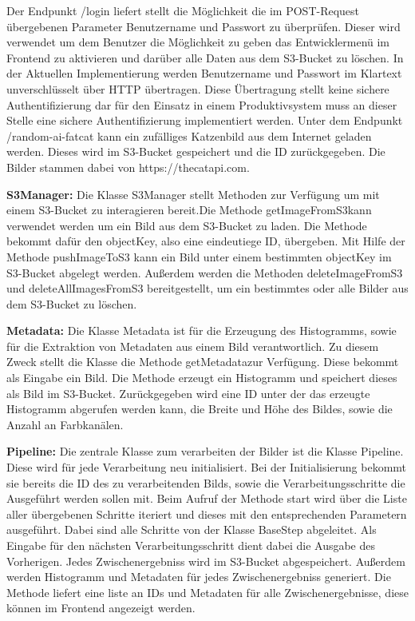 Der Endpunkt \glqq /login\grqq{} liefert stellt die Möglichkeit die im POST-Request übergebenen Parameter Benutzername und Passwort zu überprüfen. Dieser wird verwendet um dem Benutzer die Möglichkeit zu geben das Entwicklermenü im Frontend zu aktivieren und darüber alle Daten aus dem S3-Bucket zu löschen. In der Aktuellen Implementierung werden Benutzername und Passwort im Klartext unverschlüsselt über HTTP übertragen. Diese Übertragung stellt keine sichere Authentifizierung dar für den Einsatz in einem Produktivsystem muss an dieser Stelle eine sichere Authentifizierung implementiert werden.
Unter dem Endpunkt \glqq /random-ai-fatcat\grqq{} kann ein zufälliges Katzenbild aus dem Internet geladen werden. Dieses wird im S3-Bucket gespeichert und die ID zurückgegeben. Die Bilder stammen dabei von \glqq https://thecatapi.com\grqq{}. 

\textbf{S3Manager:} Die Klasse \glqq S3Manager\grqq{} stellt Methoden zur Verfügung um mit einem S3-Bucket zu interagieren bereit.Die Methode \glqq getImageFromS3\grqq kann verwendet werden um ein Bild aus dem S3-Bucket zu laden. Die Methode bekommt dafür den \glqq objectKey\grqq{}, also eine eindeutiege ID, übergeben. Mit Hilfe der Methode \glqq pushImageToS3\grqq{} kann ein Bild unter einem bestimmten \glqq objectKey\grqq{} im S3-Bucket abgelegt werden. Außerdem werden die Methoden \glqq deleteImageFromS3\grqq{} und \glqq deleteAllImagesFromS3\grqq{} bereitgestellt, um ein bestimmtes oder alle Bilder aus dem S3-Bucket zu löschen. 

\textbf{Metadata:} Die Klasse \glqq Metadata\grqq{} ist für die Erzeugung des Histogramms, sowie für die Extraktion von Metadaten aus einem Bild verantwortlich. Zu diesem Zweck stellt die Klasse die Methode \glqq getMetadata\glqq zur Verfügung. Diese bekommt als Eingabe ein Bild. Die Methode erzeugt ein Histogramm und speichert dieses als Bild im S3-Bucket. Zurückgegeben wird eine ID unter der das erzeugte Histogramm abgerufen werden kann, die Breite und Höhe des Bildes, sowie die Anzahl an Farbkanälen. 

\textbf{Pipeline:} Die zentrale Klasse zum verarbeiten der Bilder ist die Klasse \glqq Pipeline\grqq{}. Diese wird für jede Verarbeitung neu initialisiert. Bei der Initialisierung bekommt sie bereits die ID des zu verarbeitenden Bilds, sowie die Verarbeitungsschritte die Ausgeführt werden sollen mit. Beim Aufruf der Methode \glqq start\grqq{} wird über die Liste aller übergebenen Schritte iteriert und dieses mit den entsprechenden Parametern ausgeführt. Dabei sind alle Schritte von der Klasse \glqq BaseStep\grqq{} abgeleitet. Als Eingabe für den nächsten Verarbeitungsschritt dient dabei die Ausgabe des Vorherigen. Jedes Zwischenergebniss wird im S3-Bucket abgespeichert. Außerdem werden Histogramm und Metadaten für jedes Zwischenergebniss generiert. Die Methode liefert eine liste an IDs und Metadaten für alle Zwischenergebnisse, diese können im Frontend angezeigt werden.

